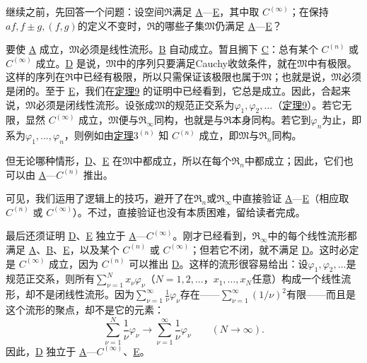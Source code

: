 \documentclass[fontsize=13pt,twoside,openany,headings=normal,parskip=false,bookmarkpackage=false,DIV=calc]{scrbook}
\begin{document}
继续之前，先回答一个问题：设空间$\mathfrak{R}$满足 \hyperref[ax:II.A]{A}—\hyperref[ax:II.E]{E}，其中取 \hyperref[ax:II.Cinfty]{$C^{(\infty)}$}；在保持$af,\allowbreak f\pm g,\allowbreak (f,\allowbreak g)$的定义不变时，$\mathfrak{R}$的哪些子集$\mathfrak{M}$仍满足 \hyperref[ax:II.A]{A}—\hyperref[ax:II.E]{E}？

\hypertarget{origpage-37}{}\label{origpage-37}要使 \hyperref[ax:II.A]{A} 成立，$\mathfrak{M}$必须是线性流形。\hyperref[ax:II.B]{B} 自动成立。暂且搁下 \hyperref[ax:II.Cn]{C}：总有某个 \hyperref[ax:II.Cn]{$C^{(n)}$} 或 \hyperref[ax:II.Cinfty]{$C^{(\infty)}$} 成立。\hyperref[ax:II.D]{D} 是说，$\mathfrak{M}$中的序列只要满足Cauchy收敛条件，就在$\mathfrak{M}$中有极限。这样的序列在$\mathfrak{R}$中已经有极限，所以只需保证该极限也属于$\mathfrak{M}$；也就是说，$\mathfrak{M}$必须是闭的。至于 \hyperref[ax:II.E]{E}，我们在\CJKglue \hyperref[thm:II.9]{定理9} 的证明中已经看到，它总是成立。因此，合起来说，$\mathfrak{M}$必须是闭线性流形。设张成$\mathfrak{M}$的规范正交系为$\varphi_1,\allowbreak \varphi_2,\allowbreak \ldots$（\hyperref[thm:II.9]{定理9}）。若它无限，显然 \hyperref[ax:II.Cinfty]{$C^{(\infty)}$} 成立，$\mathfrak{M}$便与$\mathfrak{R}_\infty$同构，也就是与$\mathfrak{R}$本身同构。若它到$\varphi_n$为止，即系为$\varphi_1,\allowbreak \ldots,\allowbreak \varphi_n$，则例如由\CJKglue \hyperref[thm:II.3n]{定理$3^{(n)}$} 知 \hyperref[ax:II.Cn]{$C^{(n)}$} 成立，即$\mathfrak{M}$与$\mathfrak{R}_n$同构。

但无论哪种情形，\hyperref[ax:II.D]{D}、\hyperref[ax:II.E]{E} 在$\mathfrak{M}$中都成立，所以在每个$\mathfrak{R}_n$中都成立；因此，它们也可以由 \hyperref[ax:II.A]{A}—\hyperref[ax:II.Cn]{$C^{(n)}$} 推出。

可见，我们运用了逻辑上的技巧，避开了在$\mathfrak{R}_n$或$\mathfrak{R}_\infty$中直接验证 \hyperref[ax:II.A]{A}—\hyperref[ax:II.E]{E}（相应取 \hyperref[ax:II.Cn]{$C^{(n)}$} 或 \hyperref[ax:II.Cinfty]{$C^{(\infty)}$}）。不过，直接验证也没有本质困难，留给读者完成。

最后还须证明 \hyperref[ax:II.D]{D}、\hyperref[ax:II.E]{E} 独立于 \hyperref[ax:II.A]{A}—\hyperref[ax:II.Cinfty]{$C^{(\infty)}$}。刚才已经看到，$\mathfrak{R}_\infty$中的每个线性流形都满足 \hyperref[ax:II.A]{A}、\hyperref[ax:II.B]{B}、\hyperref[ax:II.E]{E}，以及某个 \hyperref[ax:II.Cn]{$C^{(n)}$} 或 \hyperref[ax:II.Cinfty]{$C^{(\infty)}$}；但若它不闭，就不满足 \hyperref[ax:II.D]{D}。这时必定是 \hyperref[ax:II.Cinfty]{$C^{(\infty)}$} 成立，因为 \hyperref[ax:II.Cn]{$C^{(n)}$} 可以推出 \hyperref[ax:II.D]{D}。这样的流形很容易给出：设$\varphi_1,\allowbreak \varphi_2,\allowbreak \ldots$是规范正交系，则所有$\sum_{\nu=1}^Nx_\nu\varphi_\nu$（$N=1,\allowbreak 2,\allowbreak \ldots$，$x_1,\allowbreak \ldots,\allowbreak x_N$任意）构成一个线性流形，却不是闭线性流形。因为$\sum_{\nu=1}^\infty\frac1\nu\varphi_\nu$存在——$\sum_{\nu=1}^\infty(1/\nu)^2$有限——而且是这个流形的聚点，却不是它的元素：
\[
\sum_{\nu=1}^N\frac1\nu\varphi_\nu\longrightarrow\sum_{\nu=1}^\infty\frac1\nu\varphi_\nu\qquad(N\to\infty).
\]
因此，\hyperref[ax:II.D]{D} 独立于 \hyperref[ax:II.A]{A}—\hyperref[ax:II.Cinfty]{$C^{(\infty)}$}、\hyperref[ax:II.E]{E}。
\end{document}
